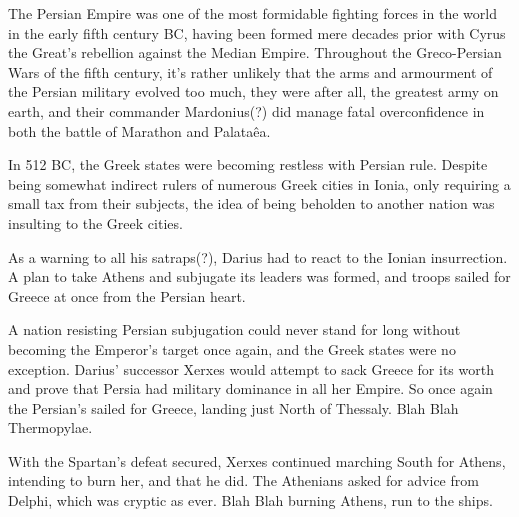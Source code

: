 \documentclass[twoside, a4paper, 12pt]{article}
\begin{document}
\par\vspace{1em}

The Persian Empire was one of the most formidable fighting forces in the world
in the early fifth century BC, having been formed mere decades prior with
Cyrus the Great's rebellion against the Median Empire. Throughout the
Greco-Persian Wars of the fifth century, it's rather unlikely that the arms
and armourment of the Persian military evolved too much, they were after all,
the greatest army on earth, and their commander Mardonius(?) did manage
fatal overconfidence in both the battle of Marathon and Palata\^ea.

\par\vspace{1em}

In 512 BC, the Greek states were becoming restless with Persian rule. Despite
being somewhat indirect rulers of numerous Greek cities in Ionia, only requiring
a small tax from their subjects, the idea of being beholden to another nation
was insulting to the Greek cities.

\par\vspace{1em}

As a warning to all his satraps(?), Darius had to react to the Ionian
insurrection. A plan to take Athens and subjugate its leaders was formed,
and troops sailed for Greece at once from the Persian heart.

\par\vspace{1em}

A nation resisting Persian subjugation could never stand for long without
becoming the Emperor's target once again, and the Greek states were no
exception. Darius' successor Xerxes would attempt to sack Greece for its worth
and prove that Persia had military dominance in all her Empire. So once again
the Persian's sailed for Greece, landing just North of Thessaly.
Blah Blah Thermopylae.

\par\vspace{1em}

With the Spartan's defeat secured, Xerxes continued marching South for
Athens, intending to burn her, and that he did. The Athenians asked for advice
from Delphi, which was cryptic as ever.
Blah Blah burning Athens, run to the ships.

\par\vspace{1em}
\end{document}
